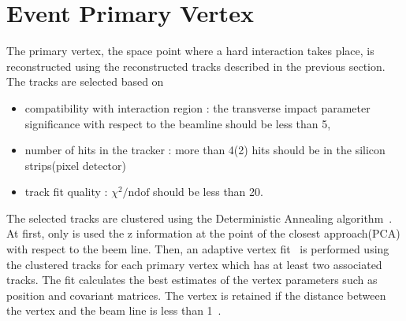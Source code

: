 

\section{ Event Primary Vertex }

The primary vertex, the space point where a hard interaction takes place,
is reconstructed using the reconstructed tracks described in the previous section. 
The tracks are selected based on 
\begin{itemize}
\item compatibility with interaction region : the transverse impact parameter 
      significance with respect to the beamline should be less than 5, 
\item number of hits in the tracker : more than 4(2) hits should be 
      in the silicon strips(pixel detector) 
\item track fit quality : $\chi^2/\textrm{ndof}$ should be less than 20.
\end{itemize}
The selected tracks are clustered using the Deterministic Annealing 
algorithm~\cite{DAclustering}.
At first, only is used the z information at the point of the closest approach(PCA) with 
respect to the beem line. 
Then, an adaptive vertex fit~\cite{AdaptiveVertexFit} is performed using the clustered tracks 
for each primary vertex
which has at least two associated tracks. The fit calculates the best estimates 
of the vertex parameters such as position and covariant matrices. 
The vertex is retained if the distance between the vertex and the beam line 
is less than 1~\cm.

